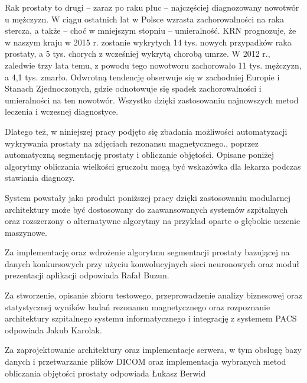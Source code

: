 \documentclass[a4paper,11pt,twoside]{report}
\theoremstyle{definition}
\begin{document}
Rak prostaty to drugi – zaraz po raku płuc – najczęściej diagnozowany nowotwór u mężczyzn. W ciągu ostatnich lat w Polsce wzrasta zachorowalności na raka stercza, a także – choć w mniejszym stopniu – umieralność. KRN prognozuje, że w naszym kraju w 2015 r. zostanie wykrytych 14 tys. nowych przypadków raka prostaty, a 5 tys. chorych z wcześniej wykrytą chorobą umrze. W 2012 r., zaledwie trzy lata temu, z powodu tego nowotworu zachorowało 11 tys. mężczyzn, a 4,1 tys. zmarło. Odwrotną tendencję obserwuje się w zachodniej Europie i Stanach Zjednoczonych, gdzie odnotowuje się spadek zachorowalności i umieralności na ten nowotwór. Wszystko dzięki zastosowaniu najnowszych metod leczenia i wczesnej diagnostyce. \cite{rynekZdrowia}
\par
Dlatego też, w niniejszej pracy podjęto się zbadania możliwości automatyzacji wykrywania prostaty na zdjęciach rezonansu magnetycznego., poprzez automatyczną segmentację prostaty i obliczanie objętości. Opisane poniżej algorytmy obliczania wielkości gruczołu mogą być wskazówka dla lekarza podczas stawiania diagnozy. 
\par
System powstały jako produkt poniższej pracy dzięki zastosowaniu modularnej architektury może być dostosowany do zaawansowanych systemów szpitalnych oraz rozszerzony o alternatywne algorytmy na przykład oparte o głębokie uczenie maszynowe.
\par
Za implementację oraz wdrożenie algorytmu segmentacji prostaty bazującej na danych konkursowych przy użyciu konwolucyjnych sieci neuronowych oraz moduł prezentacji aplikacji odpowiada Rafał Buzun.
\par
Za stworzenie, opisanie zbioru testowego, przeprowadzenie analizy biznesowej oraz statystycznej wyników badań rezonansu magnetycznego oraz rozpoznanie architektury szpitalnego systemu informatycznego i integrację z systemem PACS odpowiada Jakub Karolak.
\par
Za zaprojektowanie architektury oraz implementacje serwera, w tym obsługę bazy danych i przetwarzanie plików DICOM oraz implementacja wybranych metod obliczania objętości prostaty odpowiada Łukasz Berwid
\end{document}
